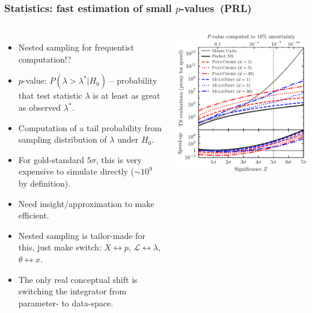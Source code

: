 \documentclass[aspectratio=169]{beamer}
\begin{document}
\begin{frame}
    \frametitle{Statistics: fast estimation of small $p$-values~(PRL)}
    \begin{columns}
        \begin{itemize}
            \item Nested sampling for frequentist computation!?
            \item $p$-value: $P(\lambda>\lambda^*|H_0)$ -- probability that test statistic $\lambda$ is at least as great as observed $\lambda^*$.
            \item Computation of a tail probability from sampling distribution of $\lambda$ under $H_0$.
            \item For gold-standard $5\sigma$, this is very expensive to simulate directly ($\sim10^9$ by definition).
            \item Need insight/approximation to make efficient.
            \item Nested sampling is tailor-made for this, just make switch: $X\leftrightarrow p$, $\mathcal{L}\leftrightarrow\lambda$, $\theta \leftrightarrow x$.
            \item The only real conceptual shift is switching the integrator from parameter- to data-space.
        \end{itemize}
        \includegraphics[width=\textwidth]{figures/pvalue.pdf}
    \end{columns}
    
\end{frame}
\end{document}
